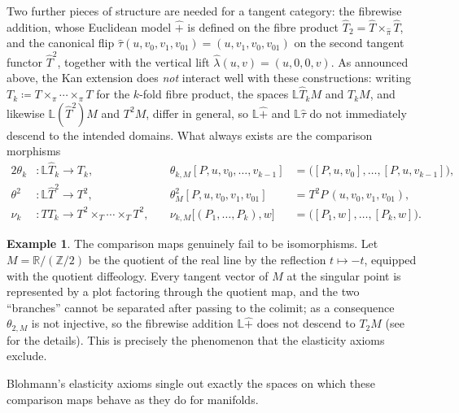 \documentclass{amsart}
\newcommand{\R}{\mathbb{R}}
\newcommand{\Z}{\mathbb{Z}}
\theoremstyle{definition}
\newtheorem{ex}[thm]{Example}
\begin{document}
Two further pieces of structure are needed for a tangent category: the
fibrewise addition, whose Euclidean model $\hat{+}$ is defined on the fibre
product $\hat{T}_2 = \hat{T} \times_{\hat\pi} \hat{T}$, and the canonical flip
$\hat{\tau}(u,v_0,v_1,v_{01}) = (u,v_1,v_0,v_{01})$ on the second tangent
functor $\hat{T}^2$, together with the vertical lift
$\hat{\lambda}(u,v) = (u,0,0,v)$. As announced above, the Kan extension does
\emph{not} interact well with these constructions: writing
$T_k \coloneqq T \times_\pi \cdots \times_\pi T$ for the $k$-fold fibre
product, the spaces $\mathbb{L}\hat{T}_k M$ and $T_k M$, and likewise
$\mathbb{L}(\hat{T}^2)M$ and $T^2M$, differ in general, so
$\mathbb{L}\hat{+}$ and $\mathbb{L}\hat{\tau}$ do not immediately descend to
the intended domains. What always exists are the comparison morphisms
\begin{alignat*}{2}
  \theta_k&\colon \mathbb{L}\hat{T}_k \to T_k , \quad
    & \theta_{k,M}[P, u, v_0, \ldots, v_{k-1}]
      &= \bigl([P, u, v_0], \ldots, [P, u, v_{k-1}]\bigr), \\
  \theta^2&\colon \mathbb{L}\hat{T}^2 \to T^2 , \quad
    & \theta^2_M[P, u, v_0, v_1, v_{01}] &= T^2P\,(u, v_0, v_1, v_{01}), \\
  \nu_k&\colon TT_k \to T^2 \times_T \cdots \times_T T^2 , \quad
    & \nu_{k,M}\bigl[(P_1,\ldots,P_k), w\bigr]
      &= \bigl([P_1, w], \ldots, [P_k, w]\bigr).
\end{alignat*}

\begin{ex}\label{ex:non-elastic}
The comparison maps genuinely fail to be isomorphisms. Let
$M = \R/(\Z/2)$ be the quotient of the real line by the reflection
$t \mapsto -t$, equipped with the quotient diffeology. Every tangent vector of
$M$ at the singular point is represented by a plot factoring through the
quotient map, and the two ``branches'' cannot be separated after passing to the
colimit; as a consequence $\theta_{2,M}$ is not injective, so the fibrewise
addition $\mathbb{L}\hat{+}$ does not descend to $T_2M$
(see \cite[Example~3.11]{M} for the details). This is precisely the phenomenon
that the elasticity axioms exclude.
\end{ex}

Blohmann's elasticity axioms single out exactly the spaces on which these
comparison maps behave as they do for manifolds.
\end{document}
